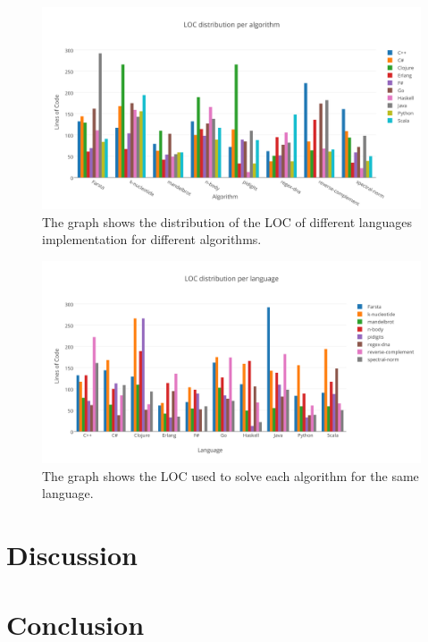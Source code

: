 \documentclass{article}
\begin{document}
\begin{figure}[h]
\includegraphics[width=\textwidth]{2}
\caption{The graph shows the distribution of the LOC of different languages implementation for different algorithms.}
\end{figure}

\begin{figure}[h]
\includegraphics[width=\textwidth]{3}
\caption{The graph shows the LOC used to solve each algorithm for the same language.}
\end{figure}

\section{Discussion}

\section{Conclusion}



\end{document}
